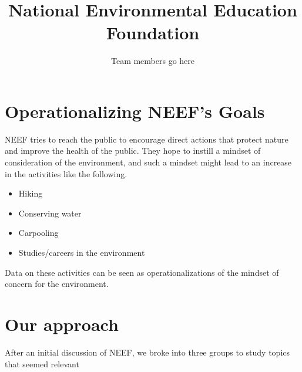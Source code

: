 \documentclass{article}
\title{National Environmental Education Foundation}
\author{Team members go here}
\begin{document}
\maketitle
{}

\section{Operationalizing NEEF's Goals}
NEEF tries to reach the public to encourage direct actions that protect nature and improve the health of the public.
They hope to instill a mindset of consideration of the environment, and such a mindset might lead to an increase
in the activities like the following.
\begin{itemize}
\item Hiking
\item Conserving water
\item Carpooling
\item Studies/careers in the environment
\end{itemize}

Data on these activities can be seen as operationalizations of the mindset of concern for the environment.

\section{Our approach}
After an initial discussion of NEEF, we broke
into three groups to study topics that seemed relevant
\end{document}
